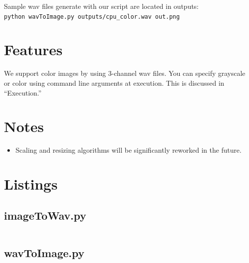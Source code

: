 \documentclass[12pt,letterpaper]{article}
\begin{document}
\noindent
Sample wav files generate with our script are located in outputs: \\
\verb!python wavToImage.py outputs/cpu_color.wav out.png!


\section{Features}

We support color images by using 3-channel wav files. You can specify grayscale or color using command line arguments at execution. This is discussed in ``Execution.''


\section{Notes}

\begin{itemize}
\item Scaling and resizing algorithms will be significantly reworked in the future.
\end{itemize}
\newpage


\section{Listings}
\subsection{imageToWav.py}
\inputminted[baselinestretch=1,fontsize=\footnotesize,linenos=true,fontfamily=courier]{python}{../imageToWav.py}
\newpage
\subsection{wavToImage.py}
\inputminted[baselinestretch=1,fontsize=\footnotesize,linenos=true,fontfamily=courier]{python}{../wavToImage.py}
\end{document}
